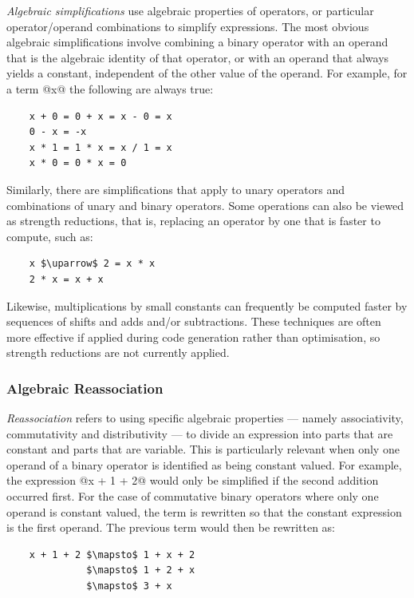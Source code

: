\emph{Algebraic simplifications} use algebraic properties of operators, or
particular operator/operand combinations to simplify expressions. The most
obvious algebraic simplifications involve combining a binary operator with an
operand that is the algebraic identity of that operator, or with an operand that
always yields a constant, independent of the other value of the operand. For
example, for a term @x@ the following are always true:
%
\begin{lstlisting}[style=Haskell,numbers=none]
%\bf$\langle$ algebraic simplification $\rangle$%
    x + 0 = 0 + x = x - 0 = x
    0 - x = -x
    x * 1 = 1 * x = x / 1 = x
    x * 0 = 0 * x = 0
\end{lstlisting}
%
Similarly, there are simplifications that apply to unary operators and
combinations of unary and binary operators. Some operations can also be viewed
as strength reductions, that is, replacing an operator by one that is faster to
compute, such as:
%
\begin{lstlisting}[style=Haskell,numbers=none,mathescape]
%\bf$\langle$ strength reduction $\rangle$%
    x $\uparrow$ 2 = x * x
    2 * x = x + x
\end{lstlisting}
%
Likewise, multiplications by small constants can frequently be computed faster
by sequences of shifts and adds and/or subtractions. These techniques are often
more effective if applied during code generation rather than optimisation, so
strength reductions are not currently applied.


\subsubsection{Algebraic Reassociation}

\emph{Reassociation} refers to using specific algebraic properties --- namely
associativity, commutativity and distributivity --- to divide an expression into
parts that are constant and parts that are variable.
This is particularly relevant when only one operand of a binary operator is
identified as being constant valued. For example, the expression @x + 1 + 2@
would only be simplified if the second addition occurred first. For the case of
commutative binary operators where only one operand is constant valued, the term
is rewritten so that the constant expression is the first operand. The previous
term would then be rewritten as:
%
\begin{lstlisting}[style=Haskell,numbers=none,mathescape]
%\bf$\langle$ algebraic reassociation $\rangle$%
    x + 1 + 2 $\mapsto$ 1 + x + 2
              $\mapsto$ 1 + 2 + x
              $\mapsto$ 3 + x
\end{lstlisting}


